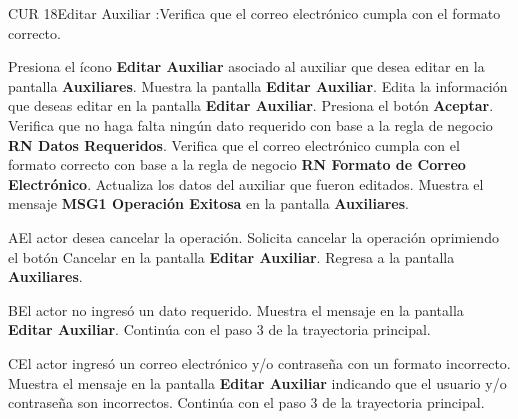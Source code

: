 \begin{UseCase}{CUR 18}{Editar Auxiliar}
{            :Verifica que el correo electrónico cumpla con el formato correcto.
    }
 \end{UseCase}

 \begin{UCtrayectoria}
 	
 	\UCpaso [\UCactor] Presiona el ícono \textbf{Editar Auxiliar} asociado al auxiliar que desea editar en la pantalla \textbf{Auxiliares}.
 	\UCpaso Muestra la pantalla \textbf{Editar Auxiliar}.
 	\UCpaso [\UCactor] Edita la información que deseas editar en la pantalla \textbf{Editar Auxiliar}.
 	\UCpaso [\UCactor] Presiona el botón \textbf{Aceptar}.
 	\UCpaso Verifica que no haga falta ningún dato requerido con base a la regla de negocio \textbf{RN Datos Requeridos}.
 	\UCpaso Verifica que el correo electrónico cumpla con el formato correcto con base a la regla de negocio \textbf{RN Formato de Correo Electrónico}.
 	\UCpaso Actualiza los datos del auxiliar que fueron editados.
 	\UCpaso Muestra el mensaje \textbf{MSG1 Operación Exitosa} en la pantalla \textbf{Auxiliares}.
 	   
 \end{UCtrayectoria}

 \begin{UCtrayectoriaA}{A}{El actor desea cancelar la operación.}
	\UCpaso[\UCactor] Solicita cancelar la operación oprimiendo el botón Cancelar en la pantalla \textbf{Editar Auxiliar}.
	\UCpaso Regresa a la pantalla \textbf{Auxiliares}.
\end{UCtrayectoriaA}

\begin{UCtrayectoriaA}{B}{El actor no ingresó un dato requerido.}
	\UCpaso Muestra el mensaje  en la pantalla \textbf{Editar Auxiliar}.
	\UCpaso Continúa con el paso 3 de la trayectoria principal.
\end{UCtrayectoriaA}

\begin{UCtrayectoriaA}{C}{El actor ingresó un correo electrónico y/o contraseña con un formato incorrecto.}
	\UCpaso Muestra el mensaje  en la pantalla \textbf{Editar Auxiliar} indicando que el usuario y/o contraseña son incorrectos.
	\UCpaso Continúa con el paso 3 de la trayectoria principal.
\end{UCtrayectoriaA} 
